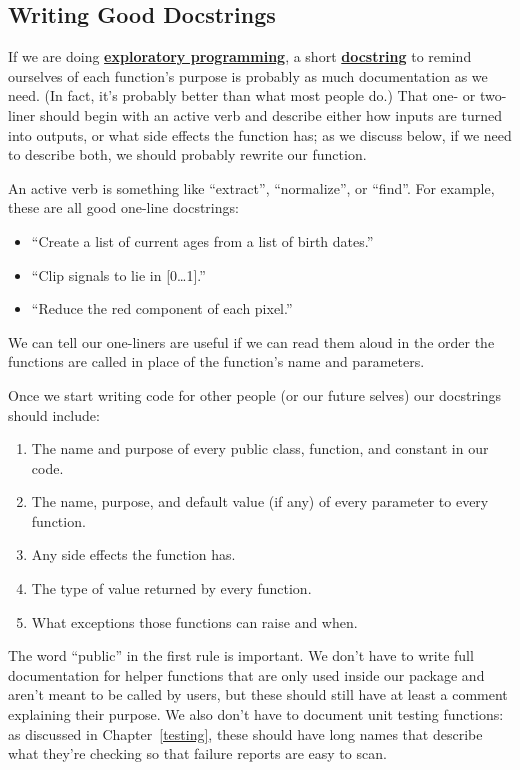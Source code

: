 \documentclass[
]{krantz}
\providecommand{\tightlist}{%
  \setlength{\itemsep}{0pt}\setlength{\parskip}{0pt}}
\newcommand{\gref}[2]{\hyperlink{#2}{\textbf{#1}}}
\begin{document}
\hypertarget{packaging-docstrings}{%
\subsection{Writing Good Docstrings}\label{packaging-docstrings}}

If we are doing \gref{exploratory programming}{exploratory\_programming},
a short \gref{docstring}{docstring} to remind ourselves of each function's purpose
is probably as much documentation as we need.
(In fact, it's probably better than what most people do.)
That one- or two-liner should begin with an active verb and describe either
how inputs are turned into outputs,
or what side effects the function has;
as we discuss below,
if we need to describe both,
we should probably rewrite our function.

An active verb is something like ``extract'', ``normalize'', or ``find''.
For example,
these are all good one-line docstrings:

\begin{itemize}
\tightlist
\item
  ``Create a list of current ages from a list of birth dates.''
\item
  ``Clip signals to lie in {[}0\ldots1{]}.''
\item
  ``Reduce the red component of each pixel.''
\end{itemize}

We can tell our one-liners are useful if we can read them aloud in the order the functions are called
in place of the function's name and parameters.

Once we start writing code for other people (or our future selves)
our docstrings should include:

\begin{enumerate}
\def\labelenumi{\arabic{enumi}.}
\tightlist
\item
  The name and purpose of every public class, function, and constant in our code.
\item
  The name, purpose, and default value (if any) of every parameter to every function.
\item
  Any side effects the function has.
\item
  The type of value returned by every function.
\item
  What exceptions those functions can raise and when.
\end{enumerate}

The word ``public'' in the first rule is important.
We don't have to write full documentation for helper functions
that are only used inside our package and aren't meant to be called by users,
but these should still have at least a comment explaining their purpose.
We also don't have to document unit testing functions:
as discussed in Chapter~\ref{testing},
these should have long names that describe what they're checking
so that failure reports are easy to scan.
\end{document}
